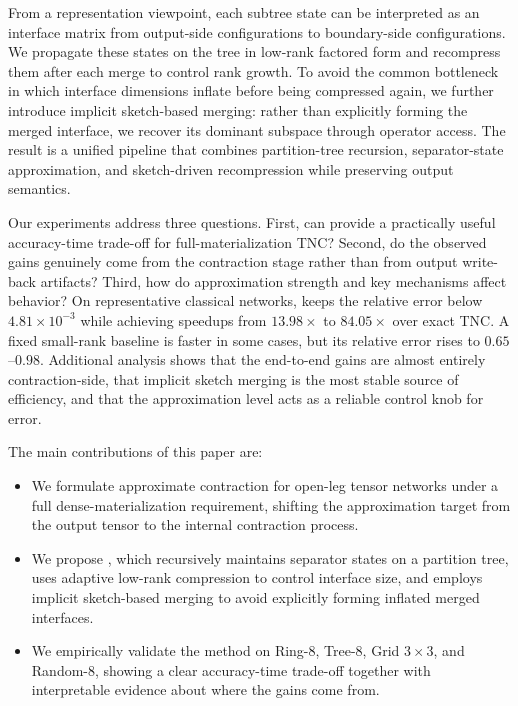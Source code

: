 From a representation viewpoint, each subtree state can be interpreted as an interface matrix from output-side configurations to boundary-side configurations. We propagate these states on the tree in low-rank factored form and recompress them after each merge to control rank growth. To avoid the common bottleneck in which interface dimensions inflate before being compressed again, we further introduce implicit sketch-based merging: rather than explicitly forming the merged interface, we recover its dominant subspace through operator access. The result is a unified pipeline that combines partition-tree recursion, separator-state approximation, and sketch-driven recompression while preserving output semantics.

Our experiments address three questions. First, can \method{} provide a practically useful accuracy-time trade-off for full-materialization TNC? Second, do the observed gains genuinely come from the contraction stage rather than from output write-back artifacts? Third, how do approximation strength and key mechanisms affect behavior? On representative classical networks, \method{} keeps the relative error below $4.81\times 10^{-3}$ while achieving speedups from $13.98\times$ to $84.05\times$ over exact TNC. A fixed small-rank baseline is faster in some cases, but its relative error rises to $0.65$--$0.98$. Additional analysis shows that the end-to-end gains are almost entirely contraction-side, that implicit sketch merging is the most stable source of efficiency, and that the approximation level acts as a reliable control knob for error.

The main contributions of this paper are:
\begin{itemize}
    \item We formulate approximate contraction for open-leg tensor networks under a full dense-materialization requirement, shifting the approximation target from the output tensor to the internal contraction process.
    \item We propose \method{}, which recursively maintains separator states on a partition tree, uses adaptive low-rank compression to control interface size, and employs implicit sketch-based merging to avoid explicitly forming inflated merged interfaces.
    \item We empirically validate the method on Ring-8, Tree-8, Grid $3\times 3$, and Random-8, showing a clear accuracy-time trade-off together with interpretable evidence about where the gains come from.
\end{itemize}
